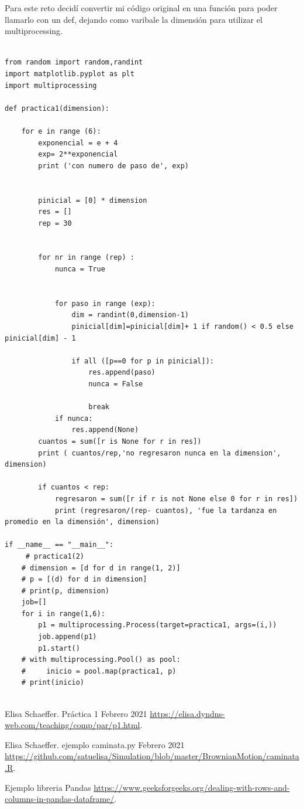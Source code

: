 \documentclass{article}
\begin{document}
Para este reto decidí convertir mi código original en una función para poder llamarlo con un def, dejando como varibale la dimensión para utilizar el multiprocessing.

\begin{verbatim}

from random import random,randint
import matplotlib.pyplot as plt
import multiprocessing

def practica1(dimension):

    for e in range (6):
        exponencial = e + 4
        exp= 2**exponencial
        print ('con numero de paso de', exp)
     
        
        pinicial = [0] * dimension
        res = []
        rep = 30
        
        
        for nr in range (rep) :
            nunca = True 
            
            
            for paso in range (exp):
                dim = randint(0,dimension-1)
                pinicial[dim]=pinicial[dim]+ 1 if random() < 0.5 else pinicial[dim] - 1
                
                if all ([p==0 for p in pinicial]):
                    res.append(paso)
                    nunca = False
                    
                    break
            if nunca:
                res.append(None)
        cuantos = sum([r is None for r in res])
        print ( cuantos/rep,'no regresaron nunca en la dimension', dimension)
        
        if cuantos < rep:
            regresaron = sum([r if r is not None else 0 for r in res])
            print (regresaron/(rep- cuantos), 'fue la tardanza en promedio en la dimensión', dimension)
            
if __name__ == "__main__":
     # practica1(2)
    # dimension = [d for d in range(1, 2)]
    # p = [(d) for d in dimension]
    # print(p, dimension)
    job=[]
    for i in range(1,6):
        p1 = multiprocessing.Process(target=practica1, args=(i,))
        job.append(p1)
        p1.start()
    # with multiprocessing.Pool() as pool:
    #     inicio = pool.map(practica1, p)
    # print(inicio)
   
\end{verbatim}

\begin{thebibliography}{99} %

 Elisa Schaeffer. Práctica 1 Febrero 2021
\url{https://elisa.dyndns-web.com/teaching/comp/par/p1.html}.

 Elisa Schaeffer. ejemplo caminata.py Febrero 2021
\url{https://github.com/satuelisa/Simulation/blob/master/BrownianMotion/caminata.R}.

 Ejemplo libreria Pandas
\url{https://www.geeksforgeeks.org/dealing-with-rows-and-columns-in-pandas-dataframe/}.

\end{thebibliography}
\end{document}
